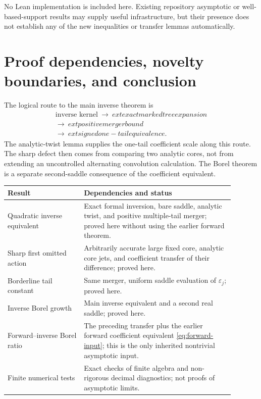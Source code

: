 \documentclass[11pt,a4paper]{article}
\numberwithin{equation}{section}
\theoremstyle{definition}
\theoremstyle{remark}
\begin{document}
No Lean implementation is included here. Existing repository asymptotic
or well-based-support results may supply useful infrastructure, but their
presence does not establish any of the new inequalities or transfer
lemmas automatically.

\section{Proof dependencies, novelty boundaries, and conclusion}
\label{sec:scope}

The logical route to the main inverse theorem is
\[
 \begin{gathered}
 \text{inverse kernel}\ \longrightarrow\ 	ext{exact marked tree expansion}\\
 \longrightarrow\ 	ext{positive merger bound}\\
 \longrightarrow\ 	ext{signed one-tail equivalence}.
 \end{gathered}
\]
The analytic-twist lemma supplies the one-tail coefficient scale along
this route. The sharp defect then comes from comparing two analytic cores,
not from extending an uncontrolled alternating convolution calculation.
The Borel theorem is a separate second-saddle consequence of the
coefficient equivalent.

\begin{center}
\small
\begin{tabular}{p{0.30\linewidth}p{0.59\linewidth}}
\toprule
Result & Dependencies and status\\
\midrule
Quadratic inverse equivalent & Exact formal inversion, bare saddle,
analytic twist, and positive multiple-tail merger; proved here without
using the earlier forward theorem.\\[3pt]
Sharp first omitted action & Arbitrarily accurate large fixed core,
analytic core jets, and coefficient transfer of their difference; proved
here.\\[3pt]
Borderline tail constant & Same merger, uniform saddle evaluation of
$\varepsilon_j$; proved here.\\[3pt]
Inverse Borel growth & Main inverse equivalent and a second real saddle;
proved here.\\[3pt]
Forward--inverse Borel ratio & The preceding transfer plus the earlier
forward coefficient equivalent \eqref{eq:forward-input}; this is the
only inherited nontrivial asymptotic input.\\[3pt]
Finite numerical tests & Exact checks of finite algebra and non-rigorous
decimal diagnostics; not proofs of asymptotic limits.\\
\bottomrule
\end{tabular}
\end{center}
\end{document}
